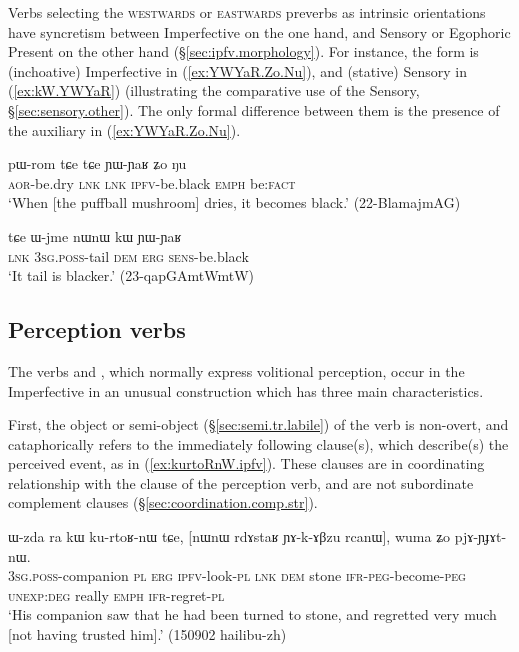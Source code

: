 Verbs selecting the \textsc{westwards} or \textsc{eastwards} preverbs as intrinsic orientations have syncretism between Imperfective on the one hand, and Sensory or Egophoric Present on the other hand (§\ref{sec:ipfv.morphology}). For instance, the form  is (inchoative) Imperfective in (\ref{ex:YWYaR.Zo.Nu}), and (stative) Sensory in (\ref{ex:kW.YWYaR}) (illustrating the comparative use of the Sensory, §\ref{sec:sensory.other}). The only formal difference between them is the presence of the auxiliary  in (\ref{ex:YWYaR.Zo.Nu}).

\begin{exe}
\ex \label{ex:YWYaR.Zo.Nu}
\gll  pɯ-rom tɕe tɕe ɲɯ-ɲaʁ ʑo ŋu \\
\textsc{aor}-be.dry \textsc{lnk} \textsc{lnk} \textsc{ipfv}-be.black \textsc{emph} be:\textsc{fact} \\
\glt `When [the puffball mushroom] dries, it becomes black.' (22-BlamajmAG)
\end{exe}

\begin{exe}
\ex \label{ex:kW.YWYaR}
\gll  tɕe ɯ-jme nɯnɯ kɯ ɲɯ-ɲaʁ \\
\textsc{lnk} \textsc{3sg}.\textsc{poss}-tail \textsc{dem} \textsc{erg} \textsc{sens}-be.black \\
\glt `It tail is blacker.' (23-qapGAmtWmtW)
\end{exe}


\subsection{Perception verbs} \label{sec:ipfv.perception}
The verbs  and , which normally express volitional perception, occur in the Imperfective in an unusual construction which has three main characteristics. 


First, the object or semi-object (§\ref{sec:semi.tr.labile}) of the verb is non-overt, and cataphorically refers to the immediately following clause(s), which describe(s) the perceived event, as in (\ref{ex:kurtoRnW.ipfv}). These clauses are in coordinating relationship with the clause of the perception verb, and are not subordinate complement clauses (§\ref{sec:coordination.comp.str}).

\begin{exe}
\ex \label{ex:kurtoRnW.ipfv}
\gll ɯ-zda ra kɯ ku-rtoʁ-nɯ tɕe, [nɯnɯ rdɤstaʁ ɲɤ-k-ɤβzu rcanɯ], wuma ʑo pjɤ-ɲɟɤt-nɯ. \\
\textsc{3sg}.\textsc{poss}-companion \textsc{pl} \textsc{erg} \textsc{ipfv}-look-\textsc{pl} \textsc{lnk} \textsc{dem} stone \textsc{ifr}-\textsc{peg}-become-\textsc{peg} \textsc{unexp}:\textsc{deg} really \textsc{emph} \textsc{ifr}-regret-\textsc{pl} \\
\glt `His companion saw that he had been turned to stone, and regretted very much [not having trusted him].' (150902 hailibu-zh)
\end{exe}

